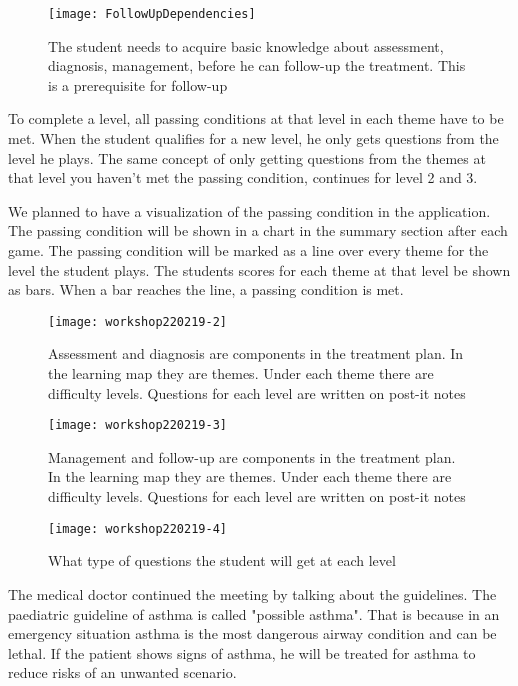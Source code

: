\begin{figure}[h!]
	\texttt{[image: FollowUpDependencies]}
		\caption {The student needs to acquire basic knowledge about assessment, diagnosis, management, before he can follow-up the treatment. This is a prerequisite for follow-up}
			\label{fig:FollowUpDependencies}
\end{figure}

To complete a level, all passing conditions at that level in each theme have to be met. When the student qualifies for a new level, he only gets questions from the level he plays. The same concept of only getting questions from the themes at that level you haven't met the passing condition, continues for level 2 and 3. 

We planned to have a visualization of the passing condition in the application. The passing condition will be shown in a chart in the summary section after each game. The passing condition will be marked as a line over every theme for the level the student plays. The students scores for each theme at that level be shown as bars. When a bar reaches the line, a passing condition is met.




\begin{figure}[h!]
	\texttt{[image: workshop220219-2]}
	\caption {Assessment and diagnosis are components in the treatment plan. In the learning map they are themes. Under each theme there are difficulty levels. Questions for each level are written on post-it notes}
\end{figure}

\begin{figure}[h!]
	\texttt{[image: workshop220219-3]}
	\caption {Management and follow-up are components in the treatment plan. In the learning map they are themes. Under each theme there are difficulty levels. Questions for each level are written on post-it notes}
\end{figure}

\begin{figure}[h!]
	\texttt{[image: workshop220219-4]}
	\caption {What type of questions the student will get at each level}
\end{figure}

The medical doctor continued the meeting by talking about the guidelines. The paediatric guideline of asthma is called "possible asthma". That is because in an emergency situation asthma is the most dangerous airway condition and can be lethal. If the patient shows signs of asthma, he will be treated for asthma to reduce risks of an unwanted scenario.

